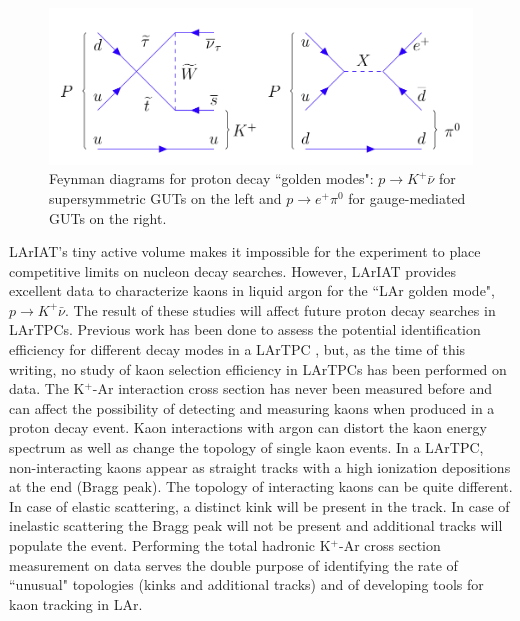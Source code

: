 \begin{figure}[hbpt]
\centering
\includegraphics[width=6.5in]{Chapter-1/Images/MandatoryFeynmannDiagrams.png}
\caption{Feynman diagrams for proton decay ``golden modes": $p \rightarrow K^+ \bar{\nu}$ for supersymmetric GUTs on the left and  $p \rightarrow e^+ \pi^0$ for gauge-mediated GUTs  on the right.}
\label{fig:MandatoryFeynmannDiagrams}
\end{figure}


LArIAT's tiny active volume makes it impossible for the experiment to place competitive limits on nucleon decay searches.  However,  LArIAT provides excellent data to characterize kaons in liquid argon for the ``LAr golden mode", $p \rightarrow K^+ \bar{\nu}$.  The result of these studies will affect future proton decay searches in LArTPCs.  Previous work has been done to assess the potential identification efficiency for different decay modes in a LArTPC \cite{Bueno2007}, but, as the time of this  writing, no study of kaon selection efficiency in LArTPCs has been performed on data. 
The K$^+$-Ar interaction cross section has never been measured before and can affect the possibility of detecting and measuring kaons when produced in a proton decay event. 
Kaon interactions with argon can distort the kaon energy spectrum as well as change the topology of single kaon events. In a LArTPC, non-interacting kaons appear as straight tracks with a high ionization depositions at the end (Bragg peak). The topology of interacting kaons can be quite different. In case of elastic scattering, a distinct kink will be present in the track. In case of inelastic scattering the Bragg peak will not be present and additional tracks will populate the event.
Performing the total hadronic K$^+$-Ar cross section measurement on data serves the double purpose of identifying the rate of ``unusual" topologies (kinks and additional tracks) and of developing tools for kaon tracking in LAr.



